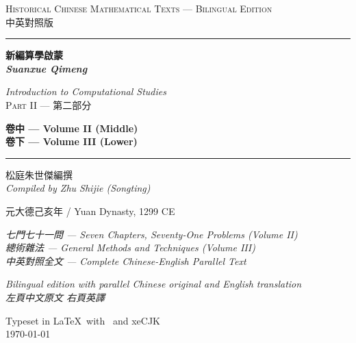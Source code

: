 \documentclass[11pt,a4paper]{article}
\newcommand{\longline}{\noindent\rule{\textwidth}{0.4pt}}
\begin{document}
\begin{titlepage}
\centering
\vspace*{2cm}

{\fontsize{14}{16}\selectfont\textsc{Historical Chinese Mathematical Texts --- Bilingual Edition}}\\[0.3cm]
{\fontsize{12}{14}\selectfont\textsc{中英對照版}}
\vspace{0.8cm}

\longline
\vspace{1.5cm}

{\fontsize{28}{34}\selectfont\bfseries\color{titlecolor}
新編算學啟蒙\\[0.5cm]
\textit{Suanxue Qimeng}\\[0.3cm]
}
\vspace{0.5cm}

{\fontsize{16}{20}\selectfont\color{sectioncolor}
\textit{Introduction to Computational Studies}\\[0.3cm]
\textsc{Part II --- 第二部分}\\[0.8cm]
}

\vspace{0.3cm}

{\fontsize{14}{18}\selectfont\bfseries\color{chaptercolor}
卷中 --- Volume II (Middle)\\[0.3cm]
卷下 --- Volume III (Lower)\\[0.3cm]
}

\vspace{1.5cm}
\longline
\vspace{1cm}

{\large 松庭朱世傑編撰\\[0.2cm]
\textit{Compiled by Zhu Shijie (Songting)}\\[0.5cm]
}

\vspace{0.5cm}

{\large 元大德己亥年 / Yuan Dynasty, 1299 CE\\[0.3cm]
}

\vspace{1cm}

\begin{minipage}{0.85\textwidth}
\centering
\textit{七門七十一問 --- Seven Chapters, Seventy-One Problems (Volume II)}\\[0.3cm]
\textit{總術雜法 --- General Methods and Techniques (Volume III)}\\[0.3cm]
\textit{中英對照全文 --- Complete Chinese-English Parallel Text}
\end{minipage}

\vfill

{\small\textit{Bilingual edition with parallel Chinese original and English translation}\\[0.3cm]
\textit{左頁中文原文 \quad 右頁英譯}\\[0.5cm]
}

{\small Typeset in \LaTeX\ with \XeLaTeX\ and xeCJK\\
\today}

\end{titlepage}
\end{document}
